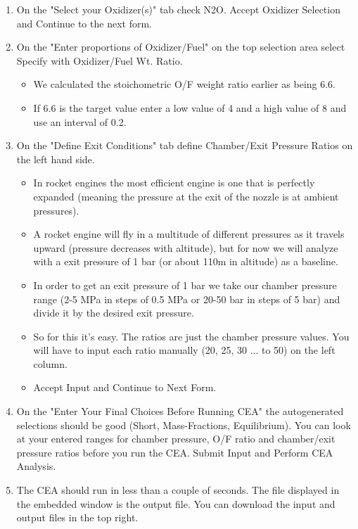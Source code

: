 \documentclass[12pt, letter paper]{article}
\begin{document}
\begin{enumerate}
					\item On the "Select your Oxidizer(s)" tab check N2O. Accept Oxidizer Selection and Continue to the next form.
					\item On the "Enter proportions of Oxidizer/Fuel" on the top selection area select Specify with Oxidizer/Fuel Wt. Ratio. 
						\begin{itemize}
							\item We calculated the stoichometric O/F weight ratio earlier as being 6.6. 
							\item If 6.6 is the target value enter a low value of 4 and a high value of 8 and use an interval of 0.2.
						\end{itemize}
					\item On the "Define Exit Conditions" tab define Chamber/Exit Pressure Ratios on the left hand side. 
						\begin{itemize}
							\item In rocket engines the most efficient engine is one that is perfectly expanded (meaning the pressure at the exit of the nozzle is at ambient pressures).
							\item A rocket engine will fly in a multitude of different pressures as it travels upward (pressure decreases with altitude),
								but for now we will analyze with a exit pressure of 1 bar (or about 110m in altitude) as a baseline.
							\item In order to get an exit pressure of 1 bar we take our chamber pressure range (2-5 MPa in steps of 0.5 MPa or 20-50 bar in steps of 5 bar) and divide it by the desired exit pressure.
							\item So for this it's easy. The ratios are just the chamber pressure values. You will have to input each ratio manually (20, 25, 30 ... to 50) on the left column.
							\item Accept Input and Continue to Next Form.
						\end{itemize}
					\item On the "Enter Your Final Choices Before Running CEA" the autogenerated selections should be good (Short, Mass-Fractions, Equilibrium). 
						You can look at your entered ranges for chamber pressure, O/F ratio and chamber/exit pressure ratios before you run the CEA.
						Submit Input and Perform CEA Analysis.
					\item The CEA should run in less than a couple of seconds. The file displayed in the embedded window is the output file. You can download the input and output files in the top right.		
				\end{enumerate}
\end{document}
